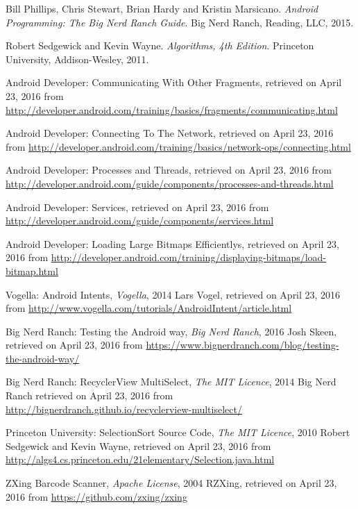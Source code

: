 \documentclass{article} %
\begin{document}
\fi

\newpage


\begin{thebibliography}{10}


Bill Phillips, Chris Stewart, Brian Hardy and Kristin Marsicano. 
\textit{Android Programming: The Big Nerd Ranch Guide}. 
Big Nerd Ranch, Reading, LLC, 2015.


Robert Sedgewick and Kevin Wayne.
\textit{Algorithms, 4th Edition}.
Princeton University, Addison-Wesley, 2011.


Android Developer: Communicating With Other Fragments, 
retrieved on April 23, 2016 from \url{http://developer.android.com/training/basics/fragments/communicating.html} 

Android Developer: Connecting To The Network, 
retrieved on April 23, 2016 from \url{http://developer.android.com/training/basics/network-ops/connecting.html} 

Android Developer: Processes and Threads, 
retrieved on April 23, 2016 from \url{http://developer.android.com/guide/components/processes-and-threads.html} 

Android Developer: Services, 
retrieved on April 23, 2016 from \url{http://developer.android.com/guide/components/services.html
}

Android Developer: Loading Large Bitmaps Efficientlys, 
retrieved on April 23, 2016 from \url{http://developer.android.com/training/displaying-bitmaps/load-bitmap.html} 

Vogella: Android Intents, 
\emph{Vogella}, 2014 Lars Vogel, 
retrieved on April 23, 2016 from \url{http://www.vogella.com/tutorials/AndroidIntent/article.html} 

Big Nerd Ranch: Testing the Android way, 
\emph{Big Nerd Ranch}, 2016 Josh Skeen, 
retrieved on April 23, 2016 from \url {https://www.bignerdranch.com/blog/testing-the-android-way/}


Big Nerd Ranch: RecyclerView MultiSelect, 
\emph{The MIT Licence}, 2014 Big Nerd Ranch
retrieved on April 23, 2016 from \url {http://bignerdranch.github.io/recyclerview-multiselect/}

Princeton University: SelectionSort Source Code, 
\emph{The MIT Licence}, 2010 Robert Sedgewick and Kevin Wayne, 
retrieved on April 23, 2016 from \url {http://algs4.cs.princeton.edu/21elementary/Selection.java.html}

ZXing Barcode Scanner, 
\emph{Apache License}, 2004 RZXing, 
retrieved on April 23, 2016 from \url {https://github.com/zxing/zxing}


\end{thebibliography}
\end{document}
